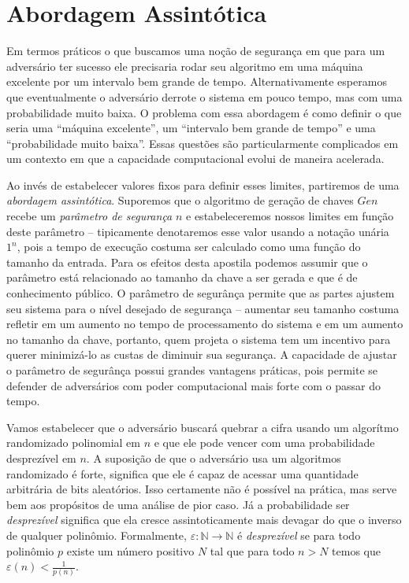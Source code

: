 \section{Abordagem Assintótica}
\label{sec:abord-assint}

Em termos práticos o que buscamos uma noção de segurança em que para um adversário ter sucesso ele precisaria rodar seu algoritmo em uma máquina excelente por um intervalo bem grande de tempo.
Alternativamente esperamos que eventualmente o adversário derrote o sistema em pouco tempo, mas com uma probabilidade muito baixa.
O problema com essa abordagem é como definir o que seria uma ``máquina excelente'', um ``intervalo bem grande de tempo'' e uma ``probabilidade muito baixa''.
Essas questões são particularmente complicados em um contexto em que a capacidade computacional evolui de maneira acelerada.

Ao invés de estabelecer valores fixos para definir esses limites, partiremos de uma {\em abordagem assintótica}.
Suporemos que o algoritmo de geração de chaves $Gen$ recebe um {\em parâmetro de segurança} $n$ e estabeleceremos nossos limites em função deste parâmetro -- tipicamente denotaremos esse valor usando a notação unária $1^n$, pois a tempo de execução costuma ser calculado como uma função do tamanho da entrada.
Para os efeitos desta apostila podemos assumir que o parâmetro está relacionado ao tamanho da chave a ser gerada e que é de conhecimento público.
O parâmetro de segurânça permite que as partes ajustem seu sistema para o nível desejado de segurança -- aumentar seu tamanho costuma refletir em um aumento no tempo de processamento do sistema e em um aumento no tamanho da chave, portanto, quem projeta o sistema tem um incentivo para querer minimizá-lo as custas de diminuir sua segurança.
A capacidade de ajustar o parâmetro de segurânça possui grandes vantagens práticas, pois permite se defender de adversários com poder computacional mais forte com o passar do tempo. 

Vamos estabelecer que o adversário buscará quebrar a cifra usando um algorítmo randomizado polinomial em $n$ e que ele pode vencer com uma probabilidade desprezível em $n$.
A suposição de que o adversário usa um algoritmos randomizado é forte, significa que ele é capaz de acessar uma quantidade arbitrária de bits aleatórios.
Isso certamente não é possível na prática, mas serve bem aos propósitos de uma análise de pior caso.
Já a probabilidade ser {\em desprezível} significa que ela cresce assintoticamente mais devagar do que o inverso de qualquer polinômio.
Formalmente, $\varepsilon: \mathbb{N} \to \mathbb{N}$ é {\em desprezível} se para todo polinômio $p$ existe um número positivo $N$ tal que para todo $n > N$ temos que $\varepsilon(n) < \frac{1}{p(n)}$.

